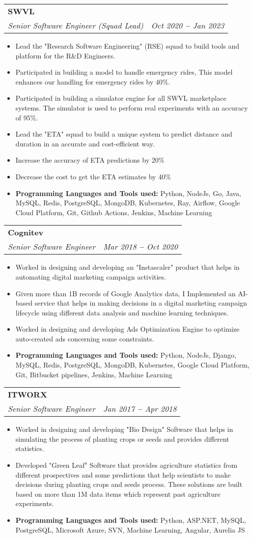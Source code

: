 \documentclass[letterpaper,11pt]{article}
\makeatletter
\newcommand{\resumeItem}[1]{
  \item\small{
    {#1 \vspace{-2pt}}
  }
}
\newcommand{\resumeSubheading}[4]{
  \vspace{-2pt}\item
    \begin{tabular*}{0.97\textwidth}[t]{l@{\extracolsep{\fill}}r}
      \textbf{#1} & #2 \\
      \textit{\small#3} & \textit{\small #4} \\
    \end{tabular*}\vspace{-7pt}
}
\newcommand{\resumeItemListStart}{\begin{itemize}}
\newcommand{\resumeItemListEnd}{\end{itemize}\vspace{-5pt}}
\makeatother
\begin{document}
	\resumeSubheading
		{SWVL}{}
		{Senior Software Engineer (Squad Lead)}{Oct 2020 \textbf{--} Jan 2023}
		\resumeItemListStart
		\resumeItem{Lead the "Research Software Engineering" (RSE) squad to build tools and platform for the R\&D Engineers.}
			\resumeItem{Participated in building a model to handle emergency rides, This model enhances our handling for emergency rides by 40\%.}
			\resumeItem{Participated in building a simulator engine for all SWVL marketplace systems. The simulator is used to perform real experiments with an accuracy of 95\%.}
			\resumeItem{Lead the "ETA" squad to build a unique system to predict distance and duration in an accurate and cost-efficient way.}
			\resumeItem{Increase the accuracy of ETA predictions by 20\%}
			\resumeItem{Decrease the cost to get the ETA estimates by 40\%}
			\resumeItem{\textbf{Programming Languages and Tools used:} Python, NodeJs, Go, Java, MySQL, Redis, PostgreSQL, MongoDB, Kubernetes, Ray,
			Airflow, Google Cloud Platform, Git, Github Actions, Jenkins, Machine Learning}
		  \resumeItemListEnd
	
	\resumeSubheading
		{Cognitev}{}
		{Senior Software Engineer }{Mar 2018 \textbf{--} Oct 2020}
		\resumeItemListStart
			\resumeItem{Worked in designing and developing an "Instascaler" product that helps in automating digital marketing campaign activities.}
			\resumeItem{Given more than 1B records of Google Analytics data, I Implemented an AI-based service that helps in making decisions in a digital marketing campaign lifecycle using different data analysis and machine learning techniques.}
			\resumeItem{Worked in designing and developing Ads Optimization Engine to optimize auto-created ads concerning some constraints.}
			\resumeItem{\textbf{Programming Languages and Tools used:} Python, NodeJs, Django, MySQL, Redis, PostgreSQL, MongoDB, Kubernetes, Google Cloud Platform, Git, Bitbucket pipelines, Jenkins, Machine Learning}
		\resumeItemListEnd
	
	\resumeSubheading
		{ITWORX}{}
		{Senior Software Engineer }{Jan 2017 \textbf{--} Apr 2018}
		\resumeItemListStart
			\resumeItem{Worked in designing and developing "Bio Design" Software that helps in simulating the process of planting crops or seeds and provides different statistics.}
			\resumeItem{Developed "Green Leaf" Software that provides agriculture statistics from different prospectives and some predictions that help scientists to make decisions during planting crops and seeds process. These solutions are built based on more than 1M data items which represent past agriculture experiments.}
			\resumeItem{\textbf{Programming Languages and Tools used:} Python, ASP.NET, MySQL, PostgreSQL, Microsoft Azure, SVN, Machine Learning, Angular, Aurelia JS}
		\resumeItemListEnd
	
\end{document}
